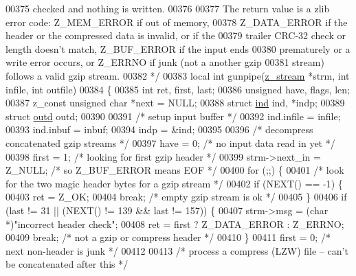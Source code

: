 \begin{DoxyCode}
00375 \textcolor{comment}{   checked and nothing is written.}
00376 \textcolor{comment}{}
00377 \textcolor{comment}{   The return value is a zlib error code: Z\_MEM\_ERROR if out of memory,}
00378 \textcolor{comment}{   Z\_DATA\_ERROR if the header or the compressed data is invalid, or if the}
00379 \textcolor{comment}{   trailer CRC-32 check or length doesn't match, Z\_BUF\_ERROR if the input ends}
00380 \textcolor{comment}{   prematurely or a write error occurs, or Z\_ERRNO if junk (not a another gzip}
00381 \textcolor{comment}{   stream) follows a valid gzip stream.}
00382 \textcolor{comment}{ */}
00383 local \textcolor{keywordtype}{int} gunpipe(\hyperlink{structz__stream__s}{z\_stream} *strm, \textcolor{keywordtype}{int} infile, \textcolor{keywordtype}{int} outfile)
00384 \{
00385     \textcolor{keywordtype}{int} ret, first, last;
00386     \textcolor{keywordtype}{unsigned} have, flags, len;
00387     z\_const \textcolor{keywordtype}{unsigned} \textcolor{keywordtype}{char} *next = NULL;
00388     \textcolor{keyword}{struct }\hyperlink{structind}{ind} ind, *indp;
00389     \textcolor{keyword}{struct }\hyperlink{structoutd}{outd} outd;
00390 
00391     \textcolor{comment}{/* setup input buffer */}
00392     ind.infile = infile;
00393     ind.inbuf = inbuf;
00394     indp = &ind;
00395 
00396     \textcolor{comment}{/* decompress concatenated gzip streams */}
00397     have = 0;                               \textcolor{comment}{/* no input data read in yet */}
00398     first = 1;                              \textcolor{comment}{/* looking for first gzip header */}
00399     strm->next\_in = Z\_NULL;                 \textcolor{comment}{/* so Z\_BUF\_ERROR means EOF */}
00400     \textcolor{keywordflow}{for} (;;) \{
00401         \textcolor{comment}{/* look for the two magic header bytes for a gzip stream */}
00402         \textcolor{keywordflow}{if} (NEXT() == -1) \{
00403             ret = Z\_OK;
00404             \textcolor{keywordflow}{break};                          \textcolor{comment}{/* empty gzip stream is ok */}
00405         \}
00406         \textcolor{keywordflow}{if} (last != 31 || (NEXT() != 139 && last != 157)) \{
00407             strm->msg = (\textcolor{keywordtype}{char} *)\textcolor{stringliteral}{"incorrect header check"};
00408             ret = first ? Z\_DATA\_ERROR : Z\_ERRNO;
00409             \textcolor{keywordflow}{break};                          \textcolor{comment}{/* not a gzip or compress header */}
00410         \}
00411         first = 0;                          \textcolor{comment}{/* next non-header is junk */}
00412 
00413         \textcolor{comment}{/* process a compress (LZW) file -- can't be concatenated after this */}

\end{DoxyCode}
